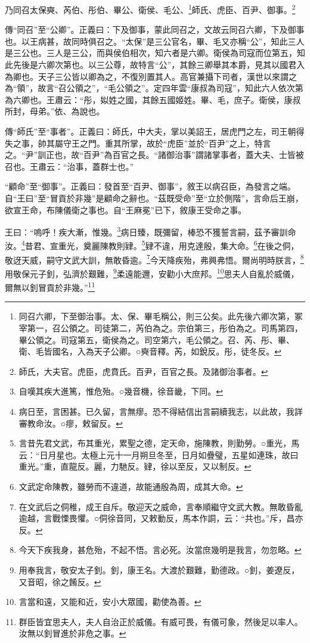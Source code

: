 乃同召太保奭、芮伯、彤伯、畢公、衛侯、毛公、\footnote{同召六卿，下至御治事。太、保、畢毛稱公，則三公矣。此先後六卿次第，冢宰第一，召公領之。司徒第二，芮伯為之。宗伯第三，彤伯為之。司馬第四，畢公領之。司寇第五，衛侯為之。司空第六，毛公領之。召、芮、彤、畢、衛、毛皆國名，入為天子公卿。○奭音釋。芮，如銳反。彤，徒冬反。}師氏、虎臣、百尹、御事。\footnote{師氏，大夫官。虎臣，虎賁氏。百尹，百官之長。及諸御治事者。}

{\noindent\zhuan{}\fzbyks 傳“同召”至“公卿”。正義曰：下及御事，蒙此同召之，文故云同召六卿，下及御事也。以王病甚，故同時俱召之。“太保”是三公官名，畢、毛又亦稱“公”，知此三人是三公也。三人是三公，而與侯伯相次，知六者是六卿。衛侯為司寇而位第五，知此先後是六卿次第也。以三公尊，故特言“公”，其餘三卿舉其本爵，見其以國君入為卿也。天子三公皆以卿為之，不復別置其人。高官兼攝下司者，漢世以來謂之為“領”，故言“召公領之”，“毛公領之”。定四年雲“康叔為司寇”，知此六人依次第為六卿也。王肅云：“彤，姒姓之國，其餘五國姬姓。畢、毛，庶子。衛侯，康叔所封，母弟。”依、為說也。 \par}

{\noindent\zhuan{}\fzbyks 傳“師氏”至“事者”。正義曰：師氏，中大夫，掌以美詔王，居虎門之左，司王朝得失之事，帥其屬守王之門。重其所掌，故於“虎臣”並於“百尹”之上，特言之。“尹”訓正也，故“百尹”為百官之長。“諸御治事”謂諸掌事者，蓋大夫、士皆被召也。王肅云：“治事，蓋群士也。” \par}

{\noindent\shu{}\fzkt “顧命”至“御事”。正義曰：發首至“百尹、御事”，敘王以病召臣，為發言之端。自“王曰”至“冒貢於非幾”是顧命之辭也。“茲既受命”至“立於側階”，言命后王崩，欲宣王命，布陳儀衛之事也。自“王麻冕”已下，敘康王受命之事。 \par}

王曰：“嗚呼！疾大漸，惟幾。\footnote{自嘆其疾大進篤，惟危殆。○幾音機，徐音畿，下同。}病日臻，既彌留，棒恐不獲誓言嗣，茲予審訓命汝。\footnote{病日至，言困甚。已久留，言無瘳。恐不得結信出言嗣續我志，以此故，我詳審教命汝。○瘳，敕留反。}昔君、宣重光，奠麗陳教則肄。\footnote{言昔先君文武，布其重光，累聖之德，定天命，施陳教，則勤勞。○重光，馬云：“日月星也。太極上元十一月朔旦冬至，日月如疊璧，五星如連珠，故曰重光。”重，直龍反。麗，力馳反。肄，徐以至反，又以制反。}肄不違，用克達殷，集大命。\footnote{文武定命陳教，雖勞而不違道，故能通殷為周，成其大命。}在後之侗，敬迓天威，嗣守文武大訓，無敢昏逾。\footnote{在文武后之侗稚，成王自斥。敬迎天之威命，言奉順繼守文武大教。無敢昏亂逾越，言戰慄畏懼。○侗徐音同，又敕動反，馬本作詷，云：“共也。”斥，昌亦反。}今天降疾殆，弗興弗悟。爾尚明時朕言，\footnote{今天下疾我身，甚危殆，不起不悟。言必死。汝當庶幾明是我言，勿忽略。}用敬保元子釗，弘濟於艱難，\footnote{用奉我言，敬安太子釗。釗，康王名。大渡於艱難，勤德政。○釗，姜遼反，又音昭，徐之餚反。}柔遠能邇，安勸小大庶邦。\footnote{言當和遠，又能和近，安小大眾國，勸使為善。}思夫人自亂於威儀，爾無以釗冒貢於非幾。”\footnote{群臣皆宜思夫人，夫人自治正於威儀。有威可畏，有儀可象，然後足以率人。汝無以釗冒進於非危之事。}


